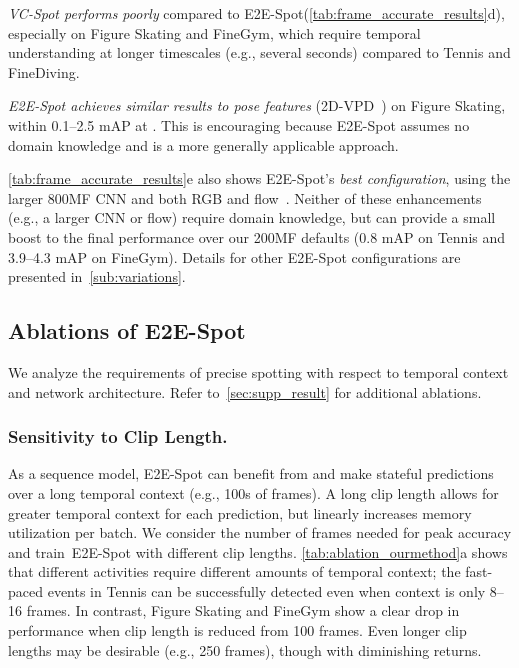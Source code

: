\documentclass[runningheads]{llncs}
\newcommand{\OURMETHOD}{{E2E-Spot}\xspace}
\newcommand{\finegym}{{FineGym}\xspace}
\newcommand{\finediving}{{FineDiving}\xspace}
\begin{document}
\textit{VC-Spot performs poorly} compared to \OURMETHOD (\autoref{tab:frame_accurate_results}d), especially on Figure Skating and \finegym, which require temporal understanding at longer timescales (e.g., several seconds) compared to Tennis and \finediving.

\textit{\OURMETHOD achieves similar results to pose features} (2D-VPD~\cite{vpd}) on Figure Skating, within 0.1--2.5 mAP at .
This is encouraging because \OURMETHOD assumes no domain knowledge and is a more generally applicable approach.

\autoref{tab:frame_accurate_results}e also shows \OURMETHOD's \textit{best configuration}, using the larger 800MF CNN and both RGB and flow~\cite{raft}.
Neither of these enhancements (e.g., a larger CNN or flow) require domain knowledge, but can provide a small boost to the final performance over our 200MF defaults (0.8 mAP on Tennis and 3.9--4.3 mAP on \finegym).
Details for other \OURMETHOD configurations are presented in~\autoref{sub:variations}.

\subsection{Ablations of \OURMETHOD}
\label{sub:ablation}

We analyze the requirements of precise spotting with respect to temporal context and network architecture. Refer to~\autoref{sec:supp_result} for additional ablations.

\subsubsection*{Sensitivity to Clip Length.}
As a sequence model, \OURMETHOD can benefit from and make stateful predictions over a long temporal context (e.g., 100s of frames).
A long clip length allows for greater temporal context
for each prediction, but linearly increases memory utilization per batch.
We consider the number of frames needed for peak accuracy and train~\OURMETHOD with different clip lengths.
\autoref{tab:ablation_ourmethod}a shows that different activities require
different amounts of temporal context; the fast-paced events in Tennis can be
successfully detected even when context is only 8--16 frames.
In contrast, Figure Skating and \finegym show a clear drop in performance when clip length is reduced from 100 frames.
Even longer clip lengths may be desirable (e.g., 250 frames), though with diminishing returns.
\end{document}
